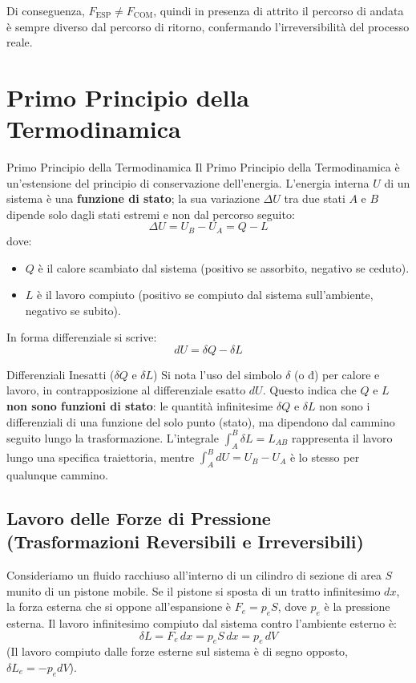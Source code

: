 Di conseguenza, $F_{\text{ESP}} \neq F_{\text{COM}}$, quindi in presenza di attrito il percorso di andata è sempre diverso dal percorso di ritorno, confermando l'irreversibilità del processo reale.
\section{Primo Principio della Termodinamica}

\begin{teorema}{Primo Principio della Termodinamica}
Il Primo Principio della Termodinamica è un'estensione del principio di conservazione dell'energia. L'energia interna $U$ di un sistema è una \textbf{funzione di stato}; la sua variazione $\Delta U$ tra due stati $A$ e $B$ dipende solo dagli stati estremi e non dal percorso seguito:
\begin{equation}
    \Delta U = U_B - U_A = Q - L
\end{equation}
dove:
\begin{itemize}
    \item $Q$ è il calore scambiato dal sistema (positivo se assorbito, negativo se ceduto).
    \item $L$ è il lavoro compiuto (positivo se compiuto dal sistema sull'ambiente, negativo se subito).
\end{itemize}
\end{teorema}

In forma differenziale si scrive:
\begin{equation}
    dU = \delta Q - \delta L
\end{equation}

\begin{osservazione}{Differenziali Inesatti ($\delta Q$ e $\delta L$)}
Si nota l'uso del simbolo $\delta$ (o đ) per calore e lavoro, in contrapposizione al differenziale esatto $dU$. Questo indica che $Q$ e $L$ \textbf{non sono funzioni di stato}: le quantità infinitesime $\delta Q$ e $\delta L$ non sono i differenziali di una funzione del solo punto (stato), ma dipendono dal cammino seguito lungo la trasformazione. L'integrale $\int_A^B \delta L = L_{AB}$ rappresenta il lavoro lungo una specifica traiettoria, mentre $\int_A^B dU = U_B - U_A$ è lo stesso per qualunque cammino.
\end{osservazione}

\subsection{Lavoro delle Forze di Pressione (Trasformazioni Reversibili e Irreversibili)}
Consideriamo un fluido racchiuso all'interno di un cilindro di sezione di area $S$ munito di un pistone mobile. Se il pistone si sposta di un tratto infinitesimo $dx$, la forza esterna che si oppone all'espansione è $F_e = p_e S$, dove $p_e$ è la pressione esterna. Il lavoro infinitesimo compiuto dal sistema contro l'ambiente esterno è:
\begin{equation}
    \delta L = F_e \, dx = p_e S \, dx = p_e \, dV
\end{equation}
(Il lavoro compiuto dalle forze esterne sul sistema è di segno opposto, $\delta L_e = -p_e dV$).

